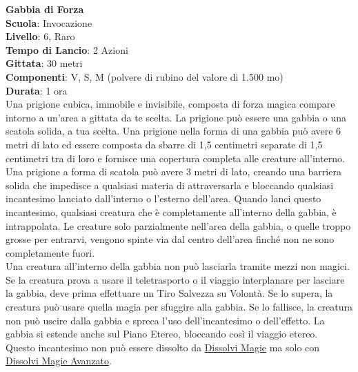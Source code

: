 \begin{multicols}{2}
\medskip\textbf{Gabbia di Forza}\\
\textbf{Scuola}: Invocazione\\
\textbf{Livello}: 6, Raro\\
\textbf{Tempo di Lancio}: 2 Azioni\\
\textbf{Gittata}: 30 metri\\
\textbf{Componenti}: V, S, M (polvere di rubino del valore di 1.500 mo)\\
\textbf{Durata}: 1 ora\\
Una prigione cubica, immobile e invisibile, composta di forza magica compare intorno a un'area a gittata da te scelta. La prigione può essere una gabbia o una scatola solida, a tua scelta. Una prigione nella forma di una gabbia può avere 6 metri di lato ed essere composta da sbarre di 1,5 centimetri separate di 1,5 centimetri tra di loro e fornisce una copertura completa alle creature all'interno. Una prigione a forma di scatola può avere 3 metri di lato, creando una barriera solida che impedisce a qualsiasi materia di attraversarla e bloccando qualsiasi incantesimo lanciato dall'interno o l'esterno dell'area. Quando lanci questo incantesimo, qualsiasi creatura che è completamente all'interno della gabbia, è intrappolata. Le creature solo parzialmente nell'area della gabbia, o quelle troppo grosse per entrarvi, vengono spinte via dal centro dell'area finché non ne sono completamente fuori.\\
Una creatura all'interno della gabbia non può lasciarla tramite mezzi non magici. Se la creatura prova a usare il teletrasporto o il viaggio interplanare per lasciare la gabbia, deve prima effettuare un Tiro Salvezza su Volontà. Se lo supera, la creatura può usare quella magia per sfuggire alla gabbia. Se lo fallisce, la creatura non può uscire dalla gabbia e spreca l'uso dell'incantesimo o dell'effetto. La gabbia si estende anche sul Piano Etereo, bloccando così il viaggio etereo.\\
Questo incantesimo non può essere dissolto da \hyperlink{dissolvimagie}{Dissolvi Magie} ma solo con \hyperlink{dissolvimagieavanzato}{Dissolvi Magie Avanzato}.


\end{multicols}
